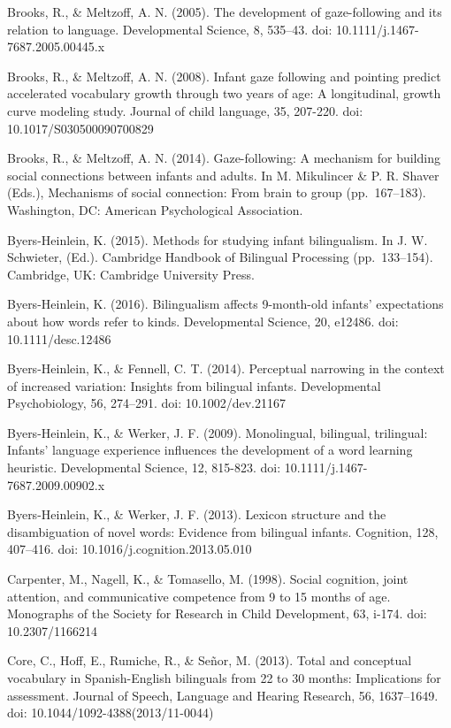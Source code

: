 \documentclass[,man,floatsintext]{apa6}
\begin{document}
Brooks, R., \& Meltzoff, A. N. (2005). The development of gaze-following and its relation to language. Developmental Science, 8, 535--43. doi: 10.1111/j.1467-7687.2005.00445.x

Brooks, R., \& Meltzoff, A. N. (2008). Infant gaze following and pointing predict accelerated vocabulary growth through two years of age: A longitudinal, growth curve modeling study. Journal of child language, 35, 207-220. doi: 10.1017/S030500090700829

Brooks, R., \& Meltzoff, A. N. (2014). Gaze-following: A mechanism for building social connections between infants and adults. In M. Mikulincer \& P. R. Shaver (Eds.), Mechanisms of social connection: From brain to group (pp.~167--183). Washington, DC: American Psychological Association.

Byers-Heinlein, K. (2015). Methods for studying infant bilingualism. In J. W. Schwieter, (Ed.). Cambridge Handbook of Bilingual Processing (pp.~133--154). Cambridge, UK: Cambridge University Press.

Byers-Heinlein, K. (2016). Bilingualism affects 9-month-old infants' expectations about how words refer to kinds. Developmental Science, 20, e12486. doi: 10.1111/desc.12486

Byers-Heinlein, K., \& Fennell, C. T. (2014). Perceptual narrowing in the context of increased variation: Insights from bilingual infants. Developmental Psychobiology, 56, 274--291. doi: 10.1002/dev.21167

Byers-Heinlein, K., \& Werker, J. F. (2009). Monolingual, bilingual, trilingual: Infants' language experience influences the development of a word learning heuristic. Developmental Science, 12, 815-823. doi: 10.1111/j.1467-7687.2009.00902.x

Byers-Heinlein, K., \& Werker, J. F. (2013). Lexicon structure and the disambiguation of novel words: Evidence from bilingual infants. Cognition, 128, 407--416. doi: 10.1016/j.cognition.2013.05.010

Carpenter, M., Nagell, K., \& Tomasello, M. (1998). Social cognition, joint attention, and communicative competence from 9 to 15 months of age. Monographs of the Society for Research in Child Development, 63, i-174. doi: 10.2307/1166214

Core, C., Hoff, E., Rumiche, R., \& Señor, M. (2013). Total and conceptual vocabulary in Spanish-English bilinguals from 22 to 30 months: Implications for assessment. Journal of Speech, Language and Hearing Research, 56, 1637--1649. doi: 10.1044/1092-4388(2013/11-0044)
\end{document}
